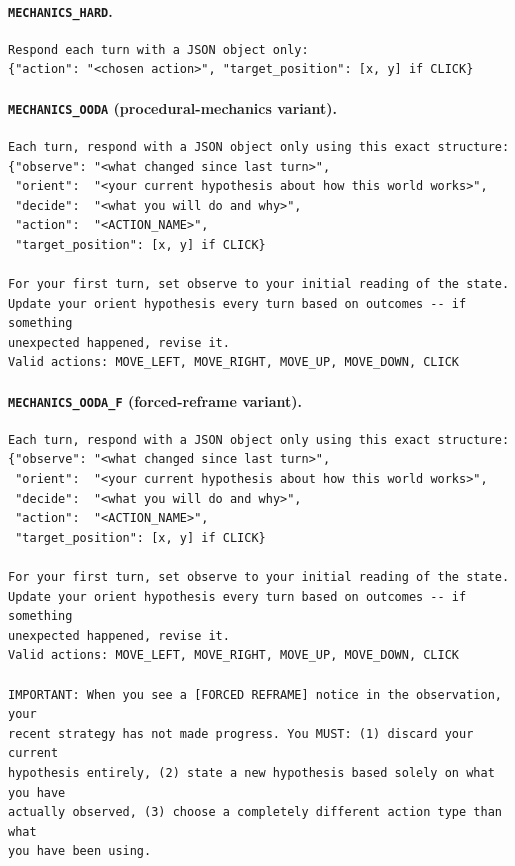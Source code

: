 \documentclass{article}
\begin{document}
\paragraph{\texttt{MECHANICS\_HARD}.}
\begin{verbatim}
Respond each turn with a JSON object only:
{"action": "<chosen action>", "target_position": [x, y] if CLICK}
\end{verbatim}

\paragraph{\texttt{MECHANICS\_OODA} (procedural-mechanics variant).}
\begin{verbatim}
Each turn, respond with a JSON object only using this exact structure:
{"observe": "<what changed since last turn>",
 "orient":  "<your current hypothesis about how this world works>",
 "decide":  "<what you will do and why>",
 "action":  "<ACTION_NAME>",
 "target_position": [x, y] if CLICK}

For your first turn, set observe to your initial reading of the state.
Update your orient hypothesis every turn based on outcomes -- if something
unexpected happened, revise it.
Valid actions: MOVE_LEFT, MOVE_RIGHT, MOVE_UP, MOVE_DOWN, CLICK
\end{verbatim}

\paragraph{\texttt{MECHANICS\_OODA\_F} (forced-reframe variant).}
\begin{verbatim}
Each turn, respond with a JSON object only using this exact structure:
{"observe": "<what changed since last turn>",
 "orient":  "<your current hypothesis about how this world works>",
 "decide":  "<what you will do and why>",
 "action":  "<ACTION_NAME>",
 "target_position": [x, y] if CLICK}

For your first turn, set observe to your initial reading of the state.
Update your orient hypothesis every turn based on outcomes -- if something
unexpected happened, revise it.
Valid actions: MOVE_LEFT, MOVE_RIGHT, MOVE_UP, MOVE_DOWN, CLICK

IMPORTANT: When you see a [FORCED REFRAME] notice in the observation, your
recent strategy has not made progress. You MUST: (1) discard your current
hypothesis entirely, (2) state a new hypothesis based solely on what you have
actually observed, (3) choose a completely different action type than what
you have been using.
\end{verbatim}
\end{document}
